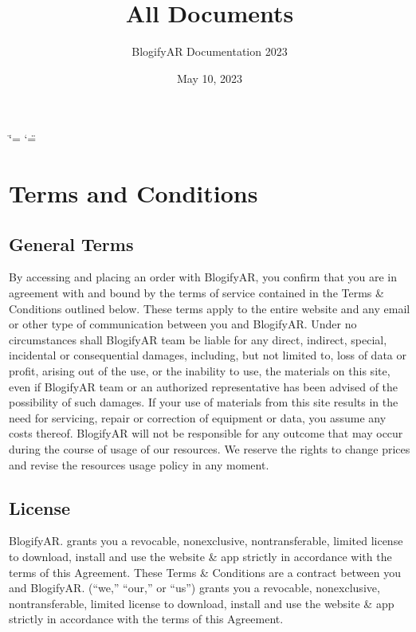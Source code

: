 \documentclass[letterpaper,11pt,openany,oneside,english,openany]{sphinxmanual}
\title{All Documents}
\date{May 10, 2023}
\author{BlogifyAR Documentation 2023}
\begin{document}
\ifdefined\shorthandoff
  \ifnum\catcode`\=\string=\active\shorthandoff{=}\fi
  \ifnum\catcode`\"=\active{}\fi
\fi

\pagestyle{empty}
\sphinxmaketitle
\pagestyle{plain}
\sphinxtableofcontents
\pagestyle{normal}
\label{\detokenize{index::doc}}


\sphinxstepscope




\chapter{Terms and Conditions}
\label{\detokenize{terms_and_conditions:terms-and-conditions}}\label{\detokenize{terms_and_conditions::doc}}

\section{\sphinxhyphen{}General Terms}
\label{\detokenize{terms_and_conditions:general-terms}}
\sphinxAtStartPar
By accessing and placing an order with BlogifyAR, you confirm that you are in agreement with and bound by the terms of
service contained in the Terms \& Conditions outlined below. These terms apply to the entire website and any email or other
type of communication between you and BlogifyAR.
Under no circumstances shall BlogifyAR team be liable for any direct, indirect, special, incidental or consequential damages,
including, but not limited to, loss of data or profit, arising out of the use, or the inability to use, the materials on this site, even
if BlogifyAR team or an authorized representative has been advised of the possibility of such damages. If your use of
materials from this site results in the need for servicing, repair or correction of equipment or data, you assume any costs
thereof.
BlogifyAR will not be responsible for any outcome that may occur during the course of usage of our resources. We reserve
the rights to change prices and revise the resources usage policy in any moment.


\section{\sphinxhyphen{}License}
\label{\detokenize{terms_and_conditions:license}}
\sphinxAtStartPar
BlogifyAR. grants you a revocable, non\sphinxhyphen{}exclusive, non\sphinxhyphen{}transferable, limited license to download, install and use the website
\& app strictly in accordance with the terms of this Agreement. These Terms \& Conditions are a contract between you and
BlogifyAR. (“we,” “our,” or “us”) grants you a revocable, non\sphinxhyphen{}exclusive, non\sphinxhyphen{}transferable, limited license to download, install
and use the website \& app strictly in accordance with the terms of this Agreement.
\end{document}
